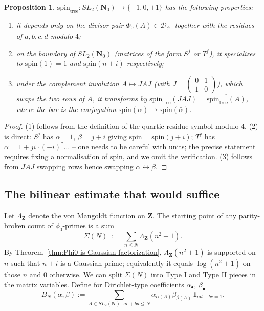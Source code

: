 \documentclass[11pt]{article}
\newtheorem{proposition}[theorem]{Proposition}
\theoremstyle{definition}
\newcommand{\N}{\mathbf{N}}
\newcommand{\Nz}{\mathbf{N}_0}
\newcommand{\Z}{\mathbf{Z}}
\newcommand{\SLNz}{SL_2(\Nz)}
\newcommand{\SLN}{SL_2(\N)}
\newcommand{\spin}{\mathrm{spin}}
\begin{document}
\begin{proposition}\label{prop:spin-tree}
$\spin_{\mathrm{tree}}\colon \SLNz \to \{-1,0,+1\}$ has the following properties:
\begin{enumerate}
  \item it depends only on the divisor pair $\Phi_0(A) \in \mathcal{D}_{\phi_0}$ together
        with the residues of $a, b, c, d$ modulo $4$;
  \item on the boundary of $\SLNz$ (matrices of the form $S^j$ or $T^j$), it specializes to
        $\spin(1) = 1$ and $\spin(n+i)$ respectively;
  \item under the complement involution $A \mapsto JAJ$ (with
        $J = \left(\begin{smallmatrix} 0 & 1 \\ 1 & 0 \end{smallmatrix}\right)$), which
        swaps the two rows of $A$, it transforms by
        $\spin_{\mathrm{tree}}(JAJ) = \overline{\spin_{\mathrm{tree}}(A)}$, where the
        bar is the conjugation $\spin(\alpha) \mapsto \spin(\bar\alpha)$.
\end{enumerate}
\end{proposition}

\begin{proof}
(1) follows from the definition of the quartic residue symbol modulo $4$. (2) is
direct: $S^j$ has $\bar\alpha = 1$, $\beta = j+i$ giving $\spin = \spin(j+i)$;
$T^j$ has $\bar\alpha = 1+ji \cdot (-i)^? \ldots$ -- one needs to be careful with units;
the precise statement requires fixing a normalisation of $\spin$, and we omit the
verification. (3) follows from $JAJ$ swapping rows hence swapping
$\bar\alpha \leftrightarrow \beta$.
\end{proof}

\subsection{The bilinear estimate that would suffice}

Let $\Lambda_{\Z}$ denote the von Mangoldt function on $\Z$. The starting point of any
parity-broken count of $\phi_0$-primes is a sum
\[
   \Sigma(N) \;:=\; \sum_{n \le N} \Lambda_\Z(n^2 + 1).
\]
By Theorem~\ref{thm:Phi0-is-Gaussian-factorization}, $\Lambda_\Z(n^2+1)$ is supported on
$n$ such that $n+i$ is a Gaussian prime; equivalently it equals $\log(n^2+1)$ on those
$n$ and $0$ otherwise. We can split $\Sigma(N)$ into Type I and Type II pieces in the
matrix variables. Define for Dirichlet-type coefficients $\alpha_\bullet$, $\beta_\bullet$
\[
   B_N(\alpha, \beta) := \sum_{A \in \SLN,\ ac+bd \le N}
      \alpha_{\alpha(A)} \beta_{\beta(A)}\,\mathbf{1}_{ad-bc=1}.
\]
\end{document}
